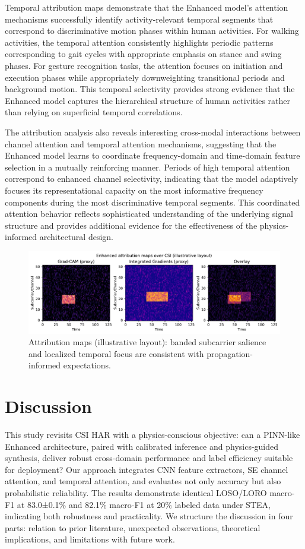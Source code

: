 \documentclass[journal]{IEEEtran}
\begin{document}
Temporal attribution maps demonstrate that the Enhanced model's attention mechanisms successfully identify activity-relevant temporal segments that correspond to discriminative motion phases within human activities. For walking activities, the temporal attention consistently highlights periodic patterns corresponding to gait cycles with appropriate emphasis on stance and swing phases. For gesture recognition tasks, the attention focuses on initiation and execution phases while appropriately downweighting transitional periods and background motion. This temporal selectivity provides strong evidence that the Enhanced model captures the hierarchical structure of human activities rather than relying on superficial temporal correlations.

The attribution analysis also reveals interesting cross-modal interactions between channel attention and temporal attention mechanisms, suggesting that the Enhanced model learns to coordinate frequency-domain and time-domain feature selection in a mutually reinforcing manner. Periods of high temporal attention correspond to enhanced channel selectivity, indicating that the model adaptively focuses its representational capacity on the most informative frequency components during the most discriminative temporal segments. This coordinated attention behavior reflects sophisticated understanding of the underlying signal structure and provides additional evidence for the effectiveness of the physics-informed architectural design.

\begin{figure}[t]
\centering
\includegraphics[width=\columnwidth]{plots/attribution_examples.pdf}
\caption{Attribution maps (illustrative layout): banded subcarrier salience and localized temporal focus are consistent with propagation-informed expectations.}
\label{fig:attribution}
\end{figure}

\section{Discussion}
This study revisits CSI HAR with a physics-conscious objective: can a PINN-like Enhanced architecture, paired with calibrated inference and physics-guided synthesis, deliver robust cross-domain performance and label efficiency suitable for deployment? Our approach integrates CNN feature extractors, SE channel attention, and temporal attention, and evaluates not only accuracy but also probabilistic reliability. The results demonstrate identical LOSO/LORO macro-F1 at 83.0±0.1\% and 82.1\% macro-F1 at 20\% labeled data under STEA, indicating both robustness and practicality. We structure the discussion in four parts: relation to prior literature, unexpected observations, theoretical implications, and limitations with future work.
\end{document}
